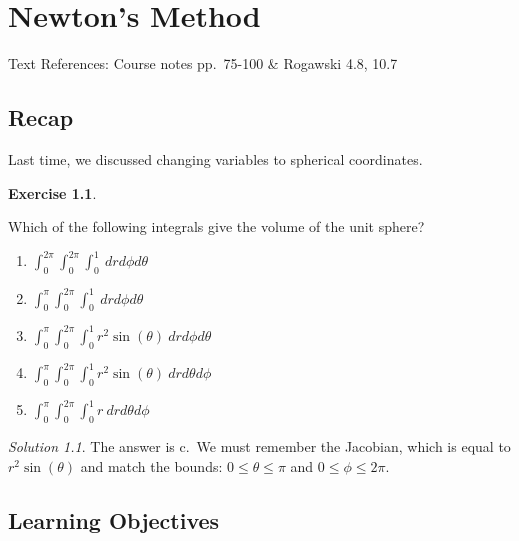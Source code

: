 \documentclass[
]{book}
\providecommand{\tightlist}{%
  \setlength{\itemsep}{0pt}\setlength{\parskip}{0pt}}
\theoremstyle{definition}
\theoremstyle{definition}
\theoremstyle{definition}
\newtheorem{exercise}{Exercise}[chapter]
\theoremstyle{definition}
\theoremstyle{remark}
\newtheorem*{solution}{Solution}
\begin{document}
\hypertarget{lec-18}{%
\chapter{Newton's Method}\label{lec-18}}

Text References: Course notes pp.~75-100 \& Rogawski 4.8, 10.7

\hypertarget{recap-16}{%
\section{Recap}\label{recap-16}}

Last time, we discussed changing variables to spherical coordinates.

\begin{exercise}
\protect\hypertarget{exr:unlabeled-div-130}{}\label{exr:unlabeled-div-130}

Which of the following integrals give the volume of the unit sphere?

\begin{enumerate}
\def\labelenumi{\alph{enumi}.}
\tightlist
\item
  \(\displaystyle \int_{0}^{2\pi} \int_0^{2\pi}\int_{0}^{1} ~drd\phi d\theta\)
\item
  \(\displaystyle \int_{0}^{\pi} \int_0^{2\pi}\int_{0}^{1} ~drd\phi d\theta\)
\item
  \(\displaystyle \int_{0}^{\pi} \int_0^{2\pi}\int_{0}^{1} r^2\sin(\theta)~drd\phi d\theta\)
\item
  \(\displaystyle \int_{0}^{\pi} \int_0^{2\pi}\int_{0}^{1} r^2\sin(\theta)~drd\theta d\phi\)
\item
  \(\displaystyle \int_{0}^{\pi} \int_0^{2\pi}\int_{0}^{1} r~drd\theta d\phi\)
\end{enumerate}

\end{exercise}

\begin{solution}

The answer is c.~We must remember the Jacobian, which is equal to \(r^2\sin(\theta)\) and match the bounds: \(0\leq \theta \leq \pi\) and \(0\leq \phi \leq 2\pi\).

\end{solution}

\hypertarget{learning-objectives-17}{%
\section{Learning Objectives}\label{learning-objectives-17}}
\end{document}
